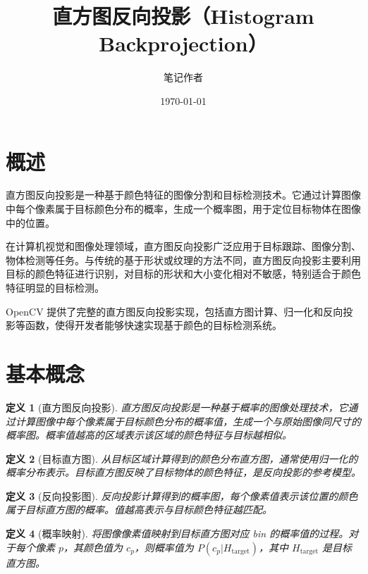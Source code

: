 \documentclass{article}
\title{\textbf{直方图反向投影（Histogram Backprojection）}}
\author{笔记作者}
\date{\today}
\newtheorem{definition}{定义}[section]
\begin{document}
\maketitle

\tableofcontents
\newpage

\section{概述}

直方图反向投影是一种基于颜色特征的图像分割和目标检测技术。它通过计算图像中每个像素属于目标颜色分布的概率，生成一个概率图，用于定位目标物体在图像中的位置。

在计算机视觉和图像处理领域，直方图反向投影广泛应用于目标跟踪、图像分割、物体检测等任务。与传统的基于形状或纹理的方法不同，直方图反向投影主要利用目标的颜色特征进行识别，对目标的形状和大小变化相对不敏感，特别适合于颜色特征明显的目标检测。

OpenCV 提供了完整的直方图反向投影实现，包括直方图计算、归一化和反向投影等函数，使得开发者能够快速实现基于颜色的目标检测系统。

\section{基本概念}

\begin{definition}[直方图反向投影]
直方图反向投影是一种基于概率的图像处理技术，它通过计算图像中每个像素属于目标颜色分布的概率值，生成一个与原始图像同尺寸的概率图。概率值越高的区域表示该区域的颜色特征与目标越相似。
\end{definition}

\begin{definition}[目标直方图]
从目标区域计算得到的颜色分布直方图，通常使用归一化的概率分布表示。目标直方图反映了目标物体的颜色特征，是反向投影的参考模型。
\end{definition}

\begin{definition}[反向投影图]
反向投影计算得到的概率图，每个像素值表示该位置的颜色属于目标直方图的概率。值越高表示与目标颜色特征越匹配。
\end{definition}

\begin{definition}[概率映射]
将图像像素值映射到目标直方图对应 bin 的概率值的过程。对于每个像素 $p$，其颜色值为 $c_p$，则概率值为 $P(c_p | H_{\text{target}})$，其中 $H_{\text{target}}$ 是目标直方图。
\end{definition}
\end{document}
